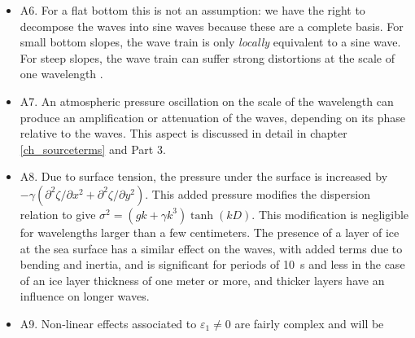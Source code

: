 \begin{itemize}
and the wave motion is well approximated by a "WKBJ" approximation: replacing the phase  $\Theta$ by a function  $S(\xb,t)$ 
with $\kb=\bnabla S$ and $\sigma=-\partial S/\partial t$ (see chapter 
  \ref{ch5}). In this context \emph{small} means that refraction or diffraction effects do not produce of significant variation 
of the wave amplitude at the scale of one wavelength. A more accurate approximation of the dispersion relation 
over a sloping bottom was given by 
   \cite{Ehrenmark2005}, in the form 
   $\sigma^2=gk \tanh(kh \beta /\tan \beta)$, where $\beta$ is the angle between the bottom and the horizontal. This correction is 
weak, only 4\% for a slope $\beta=10^\circ$. For steep slopes, reflection becomes important and the separation of the 
variables $\xb$ and $z$ becomes meaningless. The velocity potential can be obtained numerically 
  \citep[e.g.][]{Athanassoulis&Belibassakis1999,Belibassakis&al.2001}.\vspace{0.3cm}
  \item A6. For a flat bottom this is not an assumption: we have the right to decompose the waves into sine waves because these 
are a complete basis. For small bottom slopes, the wave train is only \emph{locally} equivalent to a sine wave. 
For steep slopes, the wave train can suffer strong distortions at the scale of one wavelength \citep[e.g.][]{Magne&al.2007}.\vspace{0.3cm}
  \item A7. An atmospheric pressure oscillation on the scale of the wavelength can produce an amplification or attenuation of the waves, depending 
on its phase relative to the waves. This aspect is discussed in detail in chapter \ref{ch_sourceterms} and Part 3. \vspace{0.3cm}
  \item A8. Due to surface tension, the pressure under the surface is increased by  $-\gamma \left(\partial^2 \zeta/\partial x^2+\partial^2 \zeta/\partial
  y^2\right)$. This added pressure modifies the dispersion relation to give $\sigma^2=\left(gk+\gamma k^3\right) \tanh(kD)$. 
  This modification is negligible for wavelengths larger than a few centimeters. The presence of a layer of ice at the sea surface 
has a similar effect on the waves, with added terms due to bending and inertia, and is significant for periods of 10~s and 
less \citep{Liu&MolloChristensen1988} in the case of an ice layer thickness of one meter or more, and  thicker layers have an influence on longer waves.
  \item A9. Non-linear effects associated to $\varepsilon_1 \neq 0$ are fairly complex and will be 

\end{itemize}
